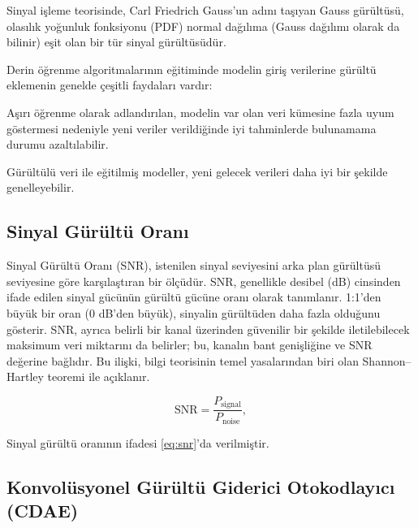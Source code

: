 Sinyal işleme teorisinde, Carl Friedrich Gauss'un adını taşıyan Gauss gürültüsü, olasılık yoğunluk fonksiyonu (PDF) normal dağılıma (Gauss dağılımı olarak da bilinir) eşit olan bir tür sinyal gürültüsüdür.

Derin öğrenme algoritmalarının eğitiminde modelin giriş verilerine gürültü eklemenin genelde çeşitli faydaları vardır:

Aşırı öğrenme olarak adlandırılan, modelin var olan veri kümesine fazla uyum göstermesi nedeniyle yeni veriler verildiğinde iyi tahminlerde bulunamama durumu azaltılabilir.

Gürültülü veri ile eğitilmiş modeller, yeni gelecek verileri daha iyi bir şekilde genelleyebilir.

\begin{comment}
    (Tudor Barbu (2013)Abstract and Applied Analysis. 2013: 8)
    (source:(Srivastava et al., 2014; Kingma
    et al., 2015; Poole et al., 2014))
\end{comment}



\subsection{Sinyal Gürültü Oranı}
Sinyal Gürültü Oranı (SNR), istenilen sinyal seviyesini arka plan gürültüsü seviyesine göre karşılaştıran bir ölçüdür. SNR, genellikle desibel (dB) cinsinden ifade edilen sinyal gücünün gürültü gücüne oranı olarak tanımlanır. 1:1'den büyük bir oran (0 dB'den büyük), sinyalin gürültüden daha fazla olduğunu gösterir. SNR, ayrıca belirli bir kanal üzerinden güvenilir bir şekilde iletilebilecek maksimum veri miktarını da belirler; bu, kanalın bant genişliğine ve SNR değerine bağlıdır. Bu ilişki, bilgi teorisinin temel yasalarından biri olan Shannon–Hartley teoremi ile açıklanır.

\begin{equation}
    \text{SNR} = \frac{P_{\text{signal}}}{P_{\text{noise}}},
    \label{eq:snr}
\end{equation}

Sinyal gürültü oranının ifadesi \eqref{eq:snr}'da verilmiştir.

\begin{comment}
    kaynak : Charles Sherman; John Butler (2007). Transducers and Arrays for Underwater Sound. Springer Science & Business Media. p. 276. ISBN 9780387331393.
\end{comment}


\subsection{Konvolüsyonel Gürültü Giderici Otokodlayıcı (CDAE)}

